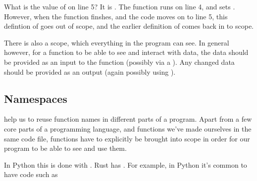 \documentclass[letterpaper,10pt,british]{sphinxmanual}
\begin{document}
\sphinxAtStartPar
What is the value of  on line 5? It is . The function  runs on line 4, and sets . However, when the function finshes, and the code moves on to line 5, this defintion of  goes out of scope, and the earlier definition of  comes back in to scope.

\sphinxAtStartPar
There is also a  scope, which everything in the program can see. In general however, for a function to be able to see and interact with data, the data should be provided as an input to the function (possibly via a {\hyperref[\detokenize{chapters/programming_fundamentals/pointers:pointers}]{}}). Any changed data should be provided as an output (again possibly using {\hyperref[\detokenize{chapters/programming_fundamentals/pointers:pointers}]{}}).


\subsection{Namespaces}
\label{\detokenize{chapters/programming_fundamentals/scope:namespaces}}
\sphinxAtStartPar
{} help us to re\sphinxhyphen{}use function names in different parts of a program. Apart from a few core parts of a programming language, and functions we’ve made ourselves in the same code file, functions have to explicitly be brought into scope in order for our program to be able to see and use them.

\sphinxAtStartPar
In Python this is done with . Rust has . For example, in Python it’s common to have code such as

\begin{sphinxVerbatim}[commandchars=\\\{\}]
\end{sphinxVerbatim}
\end{document}

